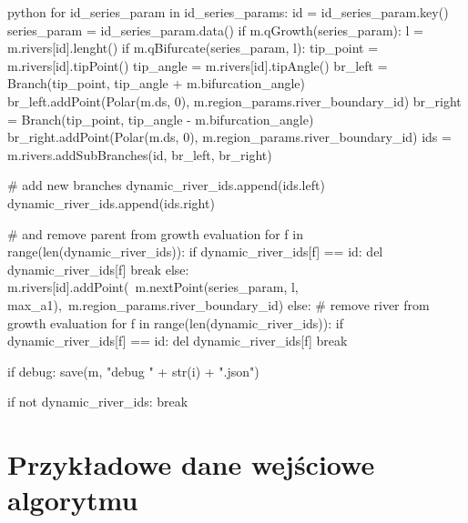 \documentclass[]{pracamgr}
\begin{document}
\begin{mintedbox}{python}
          for id_series_param in id_series_params:
              id = id_series_param.key()
              series_param = id_series_param.data()
              if m.qGrowth(series_param):
                  l = m.rivers[id].lenght()
                  if m.qBifurcate(series_param, l):
                      tip_point = m.rivers[id].tipPoint()
                      tip_angle = m.rivers[id].tipAngle()
                      br_left = Branch(tip_point, tip_angle + m.bifurcation_angle)
                      br_left.addPoint(Polar(m.ds, 0), m.region_params.river_boundary_id)
                      br_right = Branch(tip_point, tip_angle - m.bifurcation_angle)
                      br_right.addPoint(Polar(m.ds, 0), m.region_params.river_boundary_id)
                      ids = m.rivers.addSubBranches(id, br_left, br_right)

                      # add new branches
                      dynamic_river_ids.append(ids.left)
                      dynamic_river_ids.append(ids.right)

                      # and remove parent from growth evaluation
                      for f in range(len(dynamic_river_ids)):
                          if dynamic_river_ids[f] == id:
                              del dynamic_river_ids[f]
                              break
                  else: 
                      m.rivers[id].addPoint(\
                          m.nextPoint(series_param, l, max_a1),\
                          m.region_params.river_boundary_id)
              else:
                  # remove river from growth evaluation
                  for f in range(len(dynamic_river_ids)):
                      if dynamic_river_ids[f] == id:
                          del dynamic_river_ids[f]
                          break

          if debug:
              save(m, "debug " + str(i) + ".json")

          if not dynamic_river_ids:
              break

      \end{mintedbox}

  \chapter{Przykładowe dane wejściowe algorytmu}
\end{document}
